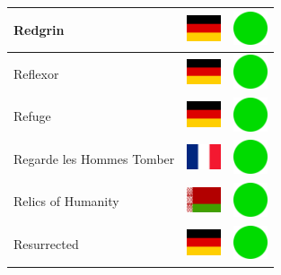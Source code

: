 \documentclass[12pt, a4paper, twoside]{report}
\begin{document}
\begin{center}
\begin{longtable}{|p{5cm}|p{2cm}|p{2cm}|}
 Redgrin                                                    & \includegraphics[width=1cm]{../4x3/de} &   \includegraphics[width=1cm]{../likes/y} \\ \hline
 Reflexor                                                   & \includegraphics[width=1cm]{../4x3/de} &   \includegraphics[width=1cm]{../likes/y} \\ \hline
 Refuge                                                     & \includegraphics[width=1cm]{../4x3/de} &   \includegraphics[width=1cm]{../likes/y} \\ \hline
 Regarde les Hommes Tomber                                  & \includegraphics[width=1cm]{../4x3/fr} &   \includegraphics[width=1cm]{../likes/y} \\ \hline
 Relics of Humanity                                         & \includegraphics[width=1cm]{../4x3/by} &   \includegraphics[width=1cm]{../likes/y} \\ \hline
 Resurrected                                                & \includegraphics[width=1cm]{../4x3/de} &   \includegraphics[width=1cm]{../likes/y} \\ \hline

\end{longtable}
\end{center}
\end{document}
